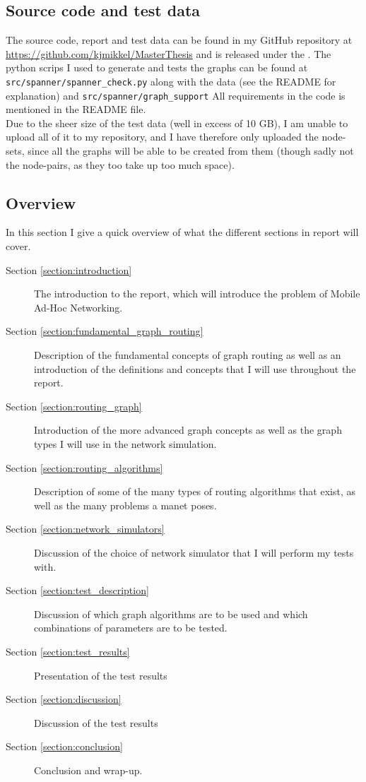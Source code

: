 \subsection{Source code and test data}
\label{section:source_code}
The source code, report and test data can be found in my GitHub repository at \url{https://github.com/kjmikkel/MasterThesis} and is released under the .
The python scrips I used to generate and tests the graphs can be found at \texttt{src/spanner/spanner\_check.py} along with the data (see the README for explanation) and \texttt{src/spanner/graph\_support} All requirements in the code is mentioned in the README file.\\

Due to the sheer size of the test data (well in excess of 10 GB), I am unable to upload all of it to my repository, and I have therefore only uploaded the node-sets, since all the graphs will be able to be created from them (though sadly not the node-pairs, as they too take up too much space).

\subsection{Overview}
In this section I give a quick overview of what the different sections in report will cover.
\begin{description}
\item[Section \ref{section:introduction}] The introduction to the report, which will introduce the problem of Mobile Ad-Hoc Networking.
\item[Section \ref{section:fundamental_graph_routing}] Description of the fundamental concepts of graph routing as well as an introduction of the definitions and concepts that I will use throughout the report.
\item[Section \ref{section:routing_graph}] Introduction of the more advanced graph concepts as well as the graph types I will use in the network simulation.
\item[Section \ref{section:routing_algorithms}] Description of some of the many types of routing algorithms that exist, as well as the many problems a \ac{manet} poses.
\item[Section \ref{section:network_simulators}] Discussion of the choice of network simulator that I will perform my tests with. 
\item[Section \ref{section:test_description}] Discussion of which graph algorithms are to be used and which combinations of parameters are to be tested.
\item[Section \ref{section:test_results}] Presentation of the test results
\item[Section \ref{section:discussion}] Discussion of the test results
\item[Section \ref{section:conclusion}] Conclusion and wrap-up.
\end{description}
